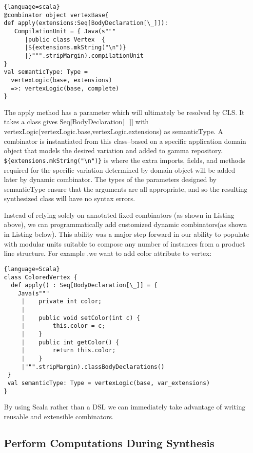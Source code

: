 \begin{lstlisting}{language=scala}
@combinator object vertexBase{
def apply(extensions:Seq[BodyDeclaration[\_]]):
   CompilationUnit = { Java(s"""
      |public class Vertex  {
      |${extensions.mkString("\n")}
      |}""".stripMargin).compilationUnit
}
val semanticType: Type =
  vertexLogic(base, extensions)
  =>: vertexLogic(base, complete)
}
\end{lstlisting}

The apply method has a parameter which will ultimately be resolved by CLS. It takes a class gives
Seq[BodyDeclaration[\_]] with vertexLogic(vertexLogic.base,vertexLogic.extensions) as semanticType. A combinator is instantiated
from this class–based on a specific application domain object that models the desired variation and added to gamma
 repository. \verb+${extensions.mkString("\n")}+ is where the extra imports, fields, and methods required for
 the specific variation determined by domain object will be added later by dynamic combinator. The types of the parameters designed by semanticType ensure
 that the arguments are all appropriate, and so the resulting synthesized class will have no syntax errors.

Instead of relying solely on annotated fixed combinators (as shown in Listing above), we can programmatically
add customized dynamic combinators(as shown in Listing below). This ability was a major step forward in our ability to populate with modular
units suitable to compose any number of instances from a product line structure. For example ,we want to add color
attribute to vertex:

\begin{lstlisting}{language=Scala}
class ColoredVertex {
  def apply() : Seq[BodyDeclaration[\_]] = {
    Java(s"""
     |    private int color;
     |
     |    public void setColor(int c) {
     |        this.color = c;
     |    }
     |    public int getColor() {
     |        return this.color;
     |    }
     |""".stripMargin).classBodyDeclarations()
 }
 val semanticType: Type = vertexLogic(base, var_extensions)
}
\end{lstlisting}

By using Scala rather than a DSL we can immediately take advantage of writing reusable and extensible combinators.


 \subsection{Perform Computations During Synthesis}

